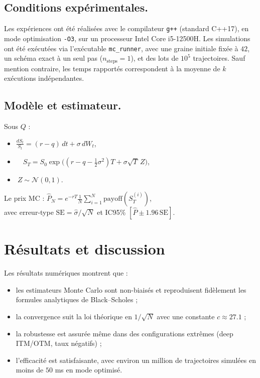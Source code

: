 \documentclass[a4paper,11pt]{article}
\begin{document}
\subsection*{Conditions expérimentales.}
Les expériences ont été réalisées avec le compilateur \texttt{g++} (standard C++17), 
en mode optimisation \texttt{-O3}, sur un processeur Intel Core i5-12500H. 
Les simulations ont été exécutées via l’exécutable \texttt{mc\_runner}, 
avec une graine initiale fixée à $42$, un schéma exact à un seul pas ($n_{\text{steps}}=1$), 
et des lots de $10^5$ trajectoires. 
Sauf mention contraire, les temps rapportés correspondent à la moyenne de $k$ exécutions indépendantes.


\subsection*{Modèle et estimateur.}
Sous $Q$ : 
\begin{itemize}
    \item \( \frac{dS_t}{S_t}=(r-q)\,dt+\sigma\,dW_t\),
    \item \(\quad S_T=S_0\exp\!\big((r-q-\tfrac12\sigma^2)T+\sigma\sqrt{T}\,Z\big) \),
    \item \(~Z\sim\mathcal N(0,1).\)
\end{itemize}

Le prix MC : \(\hat P_N=e^{-rT}\tfrac1N\sum_{i=1}^N \text{payoff}(S_T^{(i)})\), \\
avec erreur-type \(\mathrm{SE}=\hat\sigma/\sqrt{N}\) et IC95\% \([\hat P\pm 1.96\,\mathrm{SE}]\).


\section{Résultats et discussion}
Les résultats numériques montrent que :
\begin{itemize}
  \item les estimateurs Monte Carlo sont non-biaisés et reproduisent fidèlement les formules analytiques de Black--Scholes ;
  \item la convergence suit la loi théorique en $1/\sqrt{N}$ avec une constante $c \approx 27.1$ ;
  \item la robustesse est assurée même dans des configurations extrêmes (deep ITM/OTM, taux négatifs) ;
  \item l’efficacité est satisfaisante, avec environ un million de trajectoires simulées en moins de $50$ ms en mode optimisé.
\end{itemize}
\end{document}
